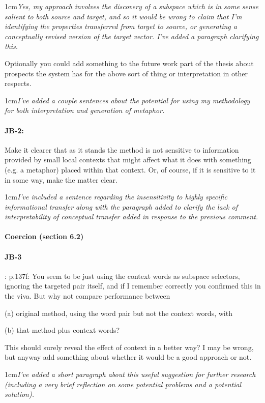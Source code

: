 \documentclass[11pt,a4paper]{article}
\newcommand{\res}[1]{\vspace{0.25cm} \begin{adjustwidth}{1cm}{}\emph{#1}\end{adjustwidth}}
\begin{document}
\res{Yes, my approach involves the discovery of a subspace which is in some sense salient to both source and target, and so it would be wrong to claim that I'm identifying the properties transferred from target to source, or generating a conceptually revised version of the target vector.  I've added a paragraph clarifying this.}

Optionally you could add something to the future work part of the thesis about prospects the system has for the above sort of thing or interpretation in other respects.

\res{I've added a couple sentences about the potential for using my methodology for both interpretation and generation of metaphor.}

\paragraph{JB-2:} Make it clearer that as it stands the method is not sensitive to information provided by small local contexts that might affect what it does with something (e.g. a metaphor) placed within that context. Or, of course, if it is sensitive to it in some way, make the matter clear.

\res{I've included a sentence regarding the insensitivity to highly specific informational transfer along with the paragraph added to clarify the lack of interpretability of conceptual transfer added in response to the previous comment.}


\paragraph{Coercion (section 6.2)}

\paragraph{JB-3}: p.137f: You seem to be just using the context words as subspace selectors, ignoring the targeted pair itself, and if I remember correctly you confirmed this in the viva. But why not compare performance between

(a) original method, using the word pair but not the context words, with

(b) that method plus context words?

This should surely reveal the effect of context in a better way? I may be wrong, but anyway add something about whether it would be a good approach or not.

\res{I've added a short paragraph about this useful suggestion for further research (including a very brief reflection on some potential problems and a potential solution).}
\end{document}
